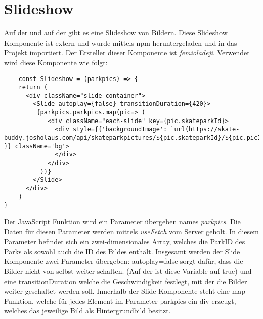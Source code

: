 \section{Slideshow}
\label{slideshow}

Auf der  und auf der  gibt es eine Slideshow von Bildern.
Diese Slideshow Komponente ist extern und wurde mittels npm heruntergeladen und in das 
Projekt importiert. Der Ersteller dieser Komponente ist \textit{femioladeji}. Verwendet wird diese 
Komponente wie folgt:

\begin{lstlisting}
    const Slideshow = (parkpics) => {
    return (
      <div className="slide-container">
        <Slide autoplay={false} transitionDuration={420}>
         {parkpics.parkpics.map(pic=> (
            <div className="each-slide" key={pic.skateparkId}>
              <div style={{'backgroundImage': `url(https://skate-buddy.josholaus.com/api/skateparkpictures/${pic.skateparkId}/${pic.picId})` }} className='bg'>
              </div>
            </div>
          ))} 
        </Slide>
      </div>
    )
}
\end{lstlisting}

Der JavaScript Funktion wird ein Parameter übergeben names \textit{parkpics}. Die 
Daten für diesen Parameter werden mittels \textit{useFetch} vom Server geholt. In diesem Parameter 
befindet sich ein zwei-dimensionales Array, welches die ParkID des Parks als sowohl auch die ID des 
Bildes enthält. Insgesamt werden der Slide Komponente zwei Parameter übergeben: autoplay={false} sorgt
dafür, dass die Bilder nicht von selbst weiter schalten. (Auf der  ist diese Variable auf true) und
eine transitionDuration welche die Geschwindigkeit festlegt, mit der die Bilder weiter geschaltet werden soll.
Innerhalb der Slide Komponente steht eine map Funktion, welche für jedes Element im Parameter parkpics 
ein div erzeugt, welches das jeweilige Bild als Hintergrundbild besitzt. 


